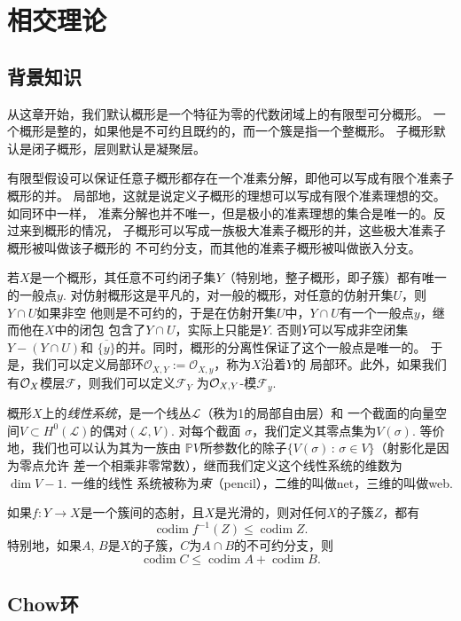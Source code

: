 \chapter{相交理论}

\section{背景知识}

从这章开始，我们默认概形是一个特征为零的代数闭域上的有限型可分概形。
一个概形是整的，如果他是不可约且既约的，而一个簇是指一个整概形。
子概形默认是闭子概形，层则默认是凝聚层。

有限型假设可以保证任意子概形都存在一个准素分解，即他可以写成有限个准素子概形的并。
局部地，这就是说定义子概形的理想可以写成有限个准素理想的交。如同环中一样，
准素分解也并不唯一，但是极小的准素理想的集合是唯一的。反过来到概形的情况，
子概形可以写成一族极大准素子概形的并，这些极大准素子概形被叫做该子概形的
不可约分支，而其他的准素子概形被叫做嵌入分支。

若$X$是一个概形，其任意不可约闭子集$Y$（特别地，整子概形，即子簇）都有唯一的一般点$y$.
对仿射概形这是平凡的，对一般的概形，对任意的仿射开集$U$，则$Y\cap U$如果非空
他则是不可约的，于是在仿射开集$U$中，$Y\cap U$有一个一般点$y$，继而他在$X$中的闭包
包含了$Y\cap U$，实际上只能是$Y$. 否则$Y$可以写成非空闭集$Y-(Y\cap U)$和
$\overline{\{y\}}$的并。同时，概形的分离性保证了这个一般点是唯一的。
于是，我们可以定义局部环$\mathcal O_{X,Y}:=\mathcal O_{X,y}$，称为$X$沿着$Y$的
局部环。此外，如果我们有$\mathcal{O}_X$模层$\mathcal F$，则我们可以定义$\mathcal F_Y$
为$\mathcal{O}_{X,Y}$-模$\mathcal F_y$.

概形$X$上的\textit{线性系统}，是一个线丛$\mathcal L$（秩为1的局部自由层）和
一个截面的向量空间$V\subset H^0(\mathcal L)$的偶对$(\mathcal L,V)$. 对每个截面
$\sigma$，我们定义其零点集为$V(\sigma)$. 等价地，我们也可以认为其为一族由
$\mathbb PV$所参数化的除子$\{V(\sigma)\,:\,\sigma\in V\}$（射影化是因为零点允许
差一个相乘非零常数），继而我们定义这个线性系统的维数为$\dim V-1$. 一维的线性
系统被称为\textit{束}（pencil），二维的叫做net，三维的叫做web.

\begin{pro}[主理想定理]
    如果$f:Y\to X$是一个簇间的态射，且$X$是光滑的，则对任何$X$的子簇$Z$，都有
    \[
        \operatorname{codim} f^{-1}(Z)\leq \operatorname{codim} Z.
    \]
    特别地，如果$A$, $B$是$X$的子簇，$C$为$A\cap B$的不可约分支，则
    \[
        \operatorname{codim} C\leq \operatorname{codim} A+\operatorname{codim} B.
    \]
\end{pro}

\section{Chow环}